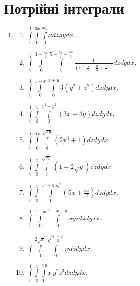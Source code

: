 \section{Потрійні інтеграли}
\begin{enumerate}
    \item
        \begin{multicols}{2}
            \begin{enumerate}[label*=\arabic*.]
                \item $\int\limits_{0}^{1}     \int\limits_{0}^{3 x}   \int\limits_{0}^{x y}xd z d y d x $.
                \item $\int\limits_{0}^{2}     \int\limits_{0}^{3-\frac{3 x}{2}}     \int\limits_{0}^{5-\frac{5 x}{2}-\frac{5 y}{3}}\frac{1}{\left(1+\frac{x}{2}+\frac{y}{3}+\frac{z}{5}\right)^{4}}d z d y d x $.
                \item $\int\limits_{0}^{1}     \int\limits_{0}^{1-x}      \int\limits_{0}^{x+y}3\left(y^{2}+ z^{2}\right)d z d y d x $.
                \item $\int\limits_{0}^{1}     \int\limits_{0}^{x}      \int\limits_{0}^{ x^{2}+ y^{2}}\left(3 x+4 y\right)d z d y d x $.
                \item $\int\limits_{0}^{1}     \int\limits_{0}^{4 x}     \int\limits_{0}^{\sqrt{x y}}\left(2 x^{3}+1\right)d z d y d x $.
                \item $\int\limits_{0}^{1}     \int\limits_{0}^{x}     \int\limits_{0}^{\sqrt{x y}}\left(1+2 {\sqrt{y}}\right)d z d y d x $.
                \item $\int\limits_{0}^{1}     \int\limits_{0}^{x}     \int\limits_{0}^{x^{2}+15 y^{2}}\left(5 x+\frac{3 z}{2}\right)d z d y d x $.
                \item $\int\limits_{0}^{1}     \int\limits_{0}^{1-x}     \int\limits_{0}^{1-x-y} x y z d z d y d x $.
                \item $\int\limits_{0}^{2}     \int\limits_{0}^{2 {\sqrt{x}}}      \int\limits_{0}^{\sqrt{\frac{4 x - y^2}{2}}}xd z d y d x $.
                \item $\int\limits_{0}^{1}     \int\limits_{0}^{x}  \int\limits_{0}^{x y}x \,y^{2} z^{3}d z d y d x $.
            \end{enumerate}
        \end{multicols}


\end{enumerate}
